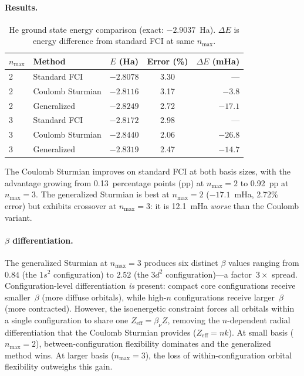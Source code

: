 \documentclass[aps,pra,twocolumn,superscriptaddress,longbibliography]{revtex4-2}
\theoremstyle{remark}
\theoremstyle{plain}
\begin{document}
\paragraph{Results.}

\begin{table}[h]
\caption{He ground state energy comparison (exact: $-2.9037$~Ha).
  $\Delta E$ is energy difference from standard FCI at same
  $n_{\max}$.}
\label{tab:sturmian_he}
\begin{ruledtabular}
\begin{tabular}{llccr}
$n_{\max}$ & Method & $E$ (Ha) & Error (\%) & $\Delta E$ (mHa) \\
\hline
2 & Standard FCI       & $-2.8078$ & 3.30 & --- \\
2 & Coulomb Sturmian   & $-2.8116$ & 3.17 & $-3.8$ \\
2 & Generalized        & $-2.8249$ & 2.72 & $-17.1$ \\
\hline
3 & Standard FCI       & $-2.8172$ & 2.98 & --- \\
3 & Coulomb Sturmian   & $-2.8440$ & 2.06 & $-26.8$ \\
3 & Generalized        & $-2.8319$ & 2.47 & $-14.7$ \\
\end{tabular}
\end{ruledtabular}
\end{table}

The Coulomb Sturmian improves on standard FCI at both basis sizes,
with the advantage growing from 0.13~percentage points (pp) at
$n_{\max} = 2$ to 0.92~pp at $n_{\max} = 3$.  The generalized
Sturmian is best at $n_{\max} = 2$ ($-17.1$~mHa, 2.72\% error) but
exhibits crossover at $n_{\max} = 3$: it is 12.1~mHa \emph{worse}
than the Coulomb variant.

\paragraph{$\beta$ differentiation.}
The generalized Sturmian at $n_{\max} = 3$ produces six distinct
$\beta$ values ranging from $0.84$ (the $1s^2$ configuration) to
$2.52$ (the $3d^2$ configuration)---a factor~$3\times$ spread.
Configuration-level differentiation \emph{is} present: compact core
configurations receive smaller~$\beta$ (more diffuse orbitals), while
high-$n$ configurations receive larger~$\beta$ (more contracted).
However, the isoenergetic constraint forces all orbitals within a
single configuration to share one $Z_{\mathrm{eff}} = \beta_\nu Z$,
removing the $n$-dependent radial differentiation that the Coulomb
Sturmian provides ($Z_{\mathrm{eff}} = nk$).  At small basis
($n_{\max} = 2$), between-configuration flexibility dominates and the
generalized method wins.  At larger basis ($n_{\max} = 3$), the loss
of within-configuration orbital flexibility outweighs this gain.
\end{document}
